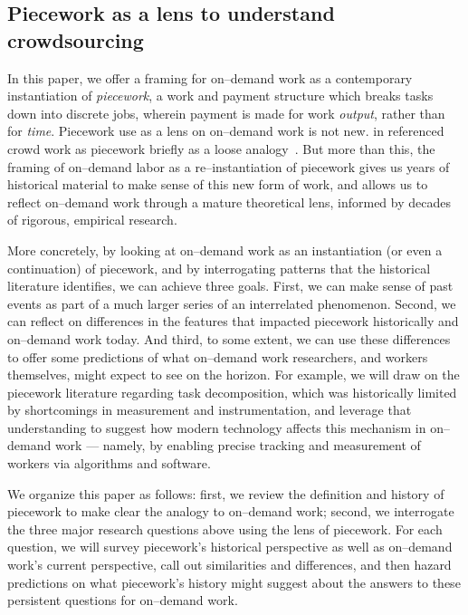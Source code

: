 \documentclass[trackingWork]{subfiles}
\begin{document}
\subsection{Piecework as a lens to understand crowdsourcing}
In this paper, we offer a framing for on--demand work as a contemporary instantiation of \textit{piecework},
a work and payment structure which breaks tasks down into discrete jobs,
wherein payment is made for work \textit{output}, rather than for \textit{time}.
Piecework use as a lens on on--demand work is not new.
\citeauthor{crowdworkFuture} in \citeyear{crowdworkFuture}
referenced crowd work as piecework briefly
as a loose analogy~\cite{crowdworkFuture}.
But more than this,
the framing of on--demand labor as a re--instantiation of piecework
gives us years of historical material to make sense of this new form of work, and allows us to reflect on--demand work through a mature theoretical lens, informed by decades of rigorous, empirical research.

More concretely, by looking at on--demand work as
an instantiation (or even a continuation) of piecework,
and by interrogating patterns that the historical literature identifies, we can achieve three goals.
First, we can make sense of past events as part of a much larger series of an interrelated phenomenon.
Second, we can reflect on differences in the features that impacted piecework historically and on--demand work today.
And third, to some extent, we can use these differences to offer some predictions of what on--demand work researchers,
and workers themselves,
might expect to see on the horizon.
For example, we will draw on the piecework literature regarding task decomposition,
which was historically limited by shortcomings in measurement and instrumentation, and
leverage that understanding to suggest how modern technology affects this mechanism in on--demand work
--- namely, by enabling precise tracking and measurement of workers via algorithms and software.

We organize this paper as follows:
first, we review the definition and history of piecework
to make clear the analogy to on--demand work;
second, we interrogate the three major research questions above using the lens of piecework. 
For each question, we will survey piecework's historical perspective as well as on--demand work's current perspective, call out similarities and differences, and then hazard predictions on what piecework's history might suggest about the answers to these persistent questions for on--demand work.
\end{document}
